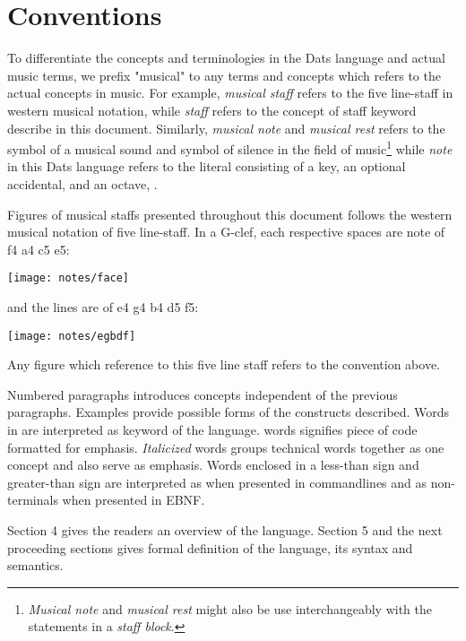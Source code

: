 \section{Conventions}

\np To differentiate the concepts and terminologies in the Dats language and
actual music terms, we prefix "musical" to any terms and concepts which
refers to the actual concepts in music. For example, \textit{musical staff} refers
to the five line-staff in western musical notation, while \textit{staff} refers to
the concept of staff keyword describe in this document. Similarly,
\textit{musical note} and \textit{musical rest} refers to the symbol of a musical
sound and symbol of silence in the field of music\footnote{\textit{Musical note} and
\textit{musical rest} might also be use interchangeably with the statements in a
\textit{staff block}.} while \textit{note} in this Dats language refers to the literal
consisting of a key, an optional accidental, and an octave, \protect{}.
 
\np Figures of musical staffs presented throughout this document follows the
western musical notation of five line-staff. In a G-clef, each respective
spaces are note of f4 a4 c5 e5:

\begin{center}
\texttt{[image: notes/face]}
\end{center}

and the lines are of e4 g4 b4 d5 f5:

\begin{center}
\texttt{[image: notes/egbdf]}
\end{center}

Any figure which reference to this five line staff refers to the convention above.

\np Numbered paragraphs introduces concepts independent of the previous paragraphs.
Examples provide possible forms of the constructs described. Words in 
are interpreted as keyword of the language.  words signifies piece of code 
formatted for emphasis.  \textit{Italicized} words groups technical words together as one
concept and also serve as emphasis. Words enclosed in a less-than sign and greater-than sign are
interpreted as  when presented in commandlines and as non-terminals when
presented in EBNF.

Section 4 gives the readers an overview of the language. Section 5 and the next proceeding sections
gives formal definition of the language, its syntax and semantics.



